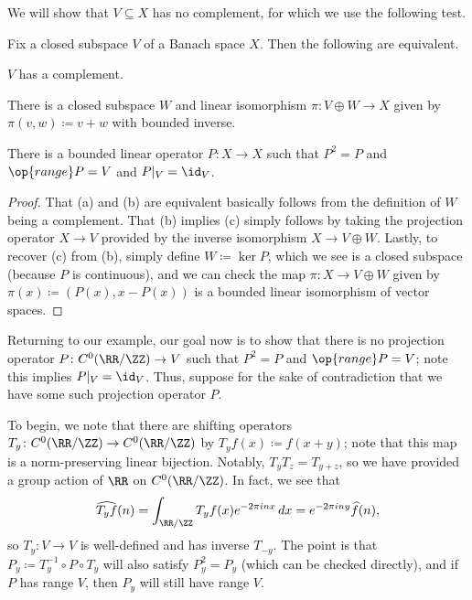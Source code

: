 \documentclass[../notes.tex]{subfiles}
\begin{document}
We will show that $V\subseteq X$ has no complement, for which we use the following test.
\begin{proposition}
	Fix a closed subspace $V$ of a Banach space $X$. Then the following are equivalent.
	\begin{listroman}
		\item $V$ has a complement.
		\item There is a closed subspace $W$ and linear isomorphism $\pi\colon V\oplus W\to X$ given by $\pi(v,w)\coloneqq v+w$ with bounded inverse.
		\item There is a bounded linear operator $P\colon X\to X$ such that $P^2=P$ and $\op{range}P=V$ and $P|_V=\id_V$.
	\end{listroman}
\end{proposition}
\begin{proof}
	That (a) and (b) are equivalent basically follows from the definition of $W$ being a complement. That (b) implies (c) simply follows by taking the projection operator $X\to V$ provided by the inverse isomorphism $X\to V\oplus W$. Lastly, to recover (c) from (b), simply define $W\coloneqq\ker P$, which we see is a closed subspace (because $P$ is continuous), and we can check the map $\pi\colon X\to V\oplus W$ given by $\pi(x)\coloneqq(P(x),x-P(x))$ is a bounded linear isomorphism of vector spaces.
\end{proof}
Returning to our example, our goal now is to show that there is no projection operator $P\colon C^0(\RR/\ZZ)\to V$ such that $P^2=P$ and $\op{range}P=V$; note this implies $P|_V=\id_V$. Thus, suppose for the sake of contradiction that we have some such projection operator $P$.

To begin, we note that there are shifting operators $T_y\colon C^0(\RR/\ZZ)\to C^0(\RR/\ZZ)$ by $T_yf(x)\coloneqq f(x+y)$; note that this map is a norm-preserving linear bijection. Notably, $T_yT_z=T_{y+z}$, so we have provided a group action of $\RR$ on $C^0(\RR/\ZZ)$. In fact, we see that
\[\widehat{T_yf}(n)=\int_{\RR/\ZZ}T_yf(x)e^{-2\pi inx}\,dx=e^{-2\pi iny}\widehat f(n),\]
so $T_y\colon V\to V$ is well-defined and has inverse $T_{-y}$. The point is that $P_y\coloneqq T_y^{-1}\circ P\circ T_y$ will also satisfy $P_y^2=P_y$ (which can be checked directly), and if $P$ has range $V$, then $P_y$ will still have range $V$.
\end{document}
